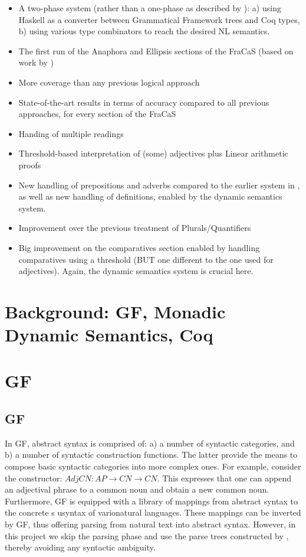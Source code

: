 \documentclass[11pt]{article}
\begin{document}
\begin{itemize}
\item A two-phase system (rather than a one-phase as described by
  \citet{bernardy_type_2017}): a) using Haskell as a converter between
  Grammatical Framework trees and Coq types, b) using various type
  combinators to reach the desired NL semantics.
\item The first run of the Anaphora and Ellipsis sections of the
  FraCaS (based on work by \citet{bernardy_jolli})
 \item  More coverage than any previous logical approach
 \item State-of-the-art results in terms of accuracy compared to all
   previous approaches, for every section of the FraCaS
  \item Handing of multiple readings
  \item  Threshold-based interpretation of (some) adjectives plus Linear arithmetic proofs
  \item New handling of prepositions and adverbs compared to the
    earlier system in \citet{bernardy_type_2017}, as well as new
    handling of definitions, enabled by the dynamic semantics system.
  \item Improvement over the previous treatment of Plurals/Quantifiers
  \item Big improvement on the comparatives section enabled by
    handling comparatives using a threshold (BUT one different to the
    one used for adjectives). Again, the dynamic semantics system is
    crucial here.




\end{itemize}
\section{Background: GF, Monadic Dynamic Semantics, Coq}


\section{GF}

\subsection{GF}
In GF, abstract syntax is comprised of: a) a number of syntactic
categories, and b) a number of syntactic construction functions. The latter
provide the means to compose basic syntactic categories into more complex
ones.  For example, consider the constructor: $AdjCN : AP → CN → CN$. This  expresses
that one can append an adjectival phrase to a common noun and obtain
a new common noun. Furthermore,  GF is equipped  with a library of mappings from abstract
syntax to the concrete s usyntax of varionatural languages. These mappings can be inverted by GF, thus offering
parsing from natural text into abstract syntax. However, in this project we skip the
parsing phase and use the parse trees constructed by \citet{Ljunglof:2012},
thereby avoiding any syntactic ambiguity. 
\end{document}
